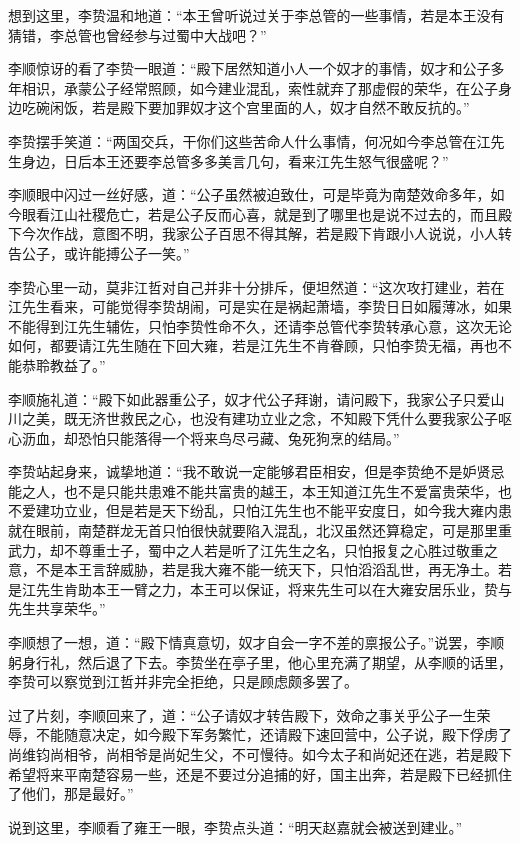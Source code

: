 想到这里，李贽温和地道：“本王曾听说过关于李总管的一些事情，若是本王没有猜错，李总管也曾经参与过蜀中大战吧？”

李顺惊讶的看了李贽一眼道：“殿下居然知道小人一个奴才的事情，奴才和公子多年相识，承蒙公子经常照顾，如今建业混乱，索性就弃了那虚假的荣华，在公子身边吃碗闲饭，若是殿下要加罪奴才这个宫里面的人，奴才自然不敢反抗的。”

李贽摆手笑道：“两国交兵，干你们这些苦命人什么事情，何况如今李总管在江先生身边，日后本王还要李总管多多美言几句，看来江先生怒气很盛呢？”

李顺眼中闪过一丝好感，道：“公子虽然被迫致仕，可是毕竟为南楚效命多年，如今眼看江山社稷危亡，若是公子反而心喜，就是到了哪里也是说不过去的，而且殿下今次作战，意图不明，我家公子百思不得其解，若是殿下肯跟小人说说，小人转告公子，或许能搏公子一笑。”

李贽心里一动，莫非江哲对自己并非十分排斥，便坦然道：“这次攻打建业，若在江先生看来，可能觉得李贽胡闹，可是实在是祸起萧墙，李贽日日如履薄冰，如果不能得到江先生辅佐，只怕李贽性命不久，还请李总管代李贽转承心意，这次无论如何，都要请江先生随在下回大雍，若是江先生不肯眷顾，只怕李贽无福，再也不能恭聆教益了。”

李顺施礼道：“殿下如此器重公子，奴才代公子拜谢，请问殿下，我家公子只爱山川之美，既无济世救民之心，也没有建功立业之念，不知殿下凭什么要我家公子呕心沥血，却恐怕只能落得一个将来鸟尽弓藏、兔死狗烹的结局。”

李贽站起身来，诚挚地道：“我不敢说一定能够君臣相安，但是李贽绝不是妒贤忌能之人，也不是只能共患难不能共富贵的越王，本王知道江先生不爱富贵荣华，也不爱建功立业，但是若是天下纷乱，只怕江先生也不能平安度日，如今我大雍内患就在眼前，南楚群龙无首只怕很快就要陷入混乱，北汉虽然还算稳定，可是那里重武力，却不尊重士子，蜀中之人若是听了江先生之名，只怕报复之心胜过敬重之意，不是本王言辞威胁，若是我大雍不能一统天下，只怕滔滔乱世，再无净土。若是江先生肯助本王一臂之力，本王可以保证，将来先生可以在大雍安居乐业，贽与先生共享荣华。”

李顺想了一想，道：“殿下情真意切，奴才自会一字不差的禀报公子。”说罢，李顺躬身行礼，然后退了下去。李贽坐在亭子里，他心里充满了期望，从李顺的话里，李贽可以察觉到江哲并非完全拒绝，只是顾虑颇多罢了。

过了片刻，李顺回来了，道：“公子请奴才转告殿下，效命之事关乎公子一生荣辱，不能随意决定，如今殿下军务繁忙，还请殿下速回营中，公子说，殿下俘虏了尚维钧尚相爷，尚相爷是尚妃生父，不可慢待。如今太子和尚妃还在逃，若是殿下希望将来平南楚容易一些，还是不要过分追捕的好，国主出奔，若是殿下已经抓住了他们，那是最好。”

说到这里，李顺看了雍王一眼，李贽点头道：“明天赵嘉就会被送到建业。”

